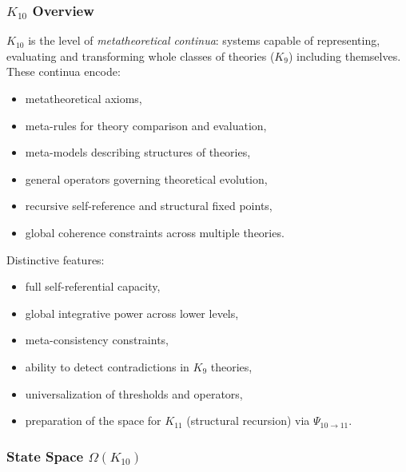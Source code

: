 

\subsubsection{$K_{10}$ Overview}
\label{sec:k10-overview}

$K_{10}$ is the level of \emph{metatheoretical continua}: systems capable of
representing, evaluating and transforming whole classes of theories ($K_9$)
including themselves. These continua encode:
\begin{itemize}
    \item metatheoretical axioms,
    \item meta-rules for theory comparison and evaluation,
    \item meta-models describing structures of theories,
    \item general operators governing theoretical evolution,
    \item recursive self-reference and structural fixed points,
    \item global coherence constraints across multiple theories.
\end{itemize}

Distinctive features:
\begin{itemize}
    \item full self-referential capacity,
    \item global integrative power across lower levels,
    \item meta-consistency constraints,
    \item ability to detect contradictions in $K_9$ theories,
    \item universalization of thresholds and operators,
    \item preparation of the space for $K_{11}$ (structural recursion) via $\Psi_{10\to11}$.
\end{itemize}

\subsubsection{State Space $\Omega(K_{10})$}

